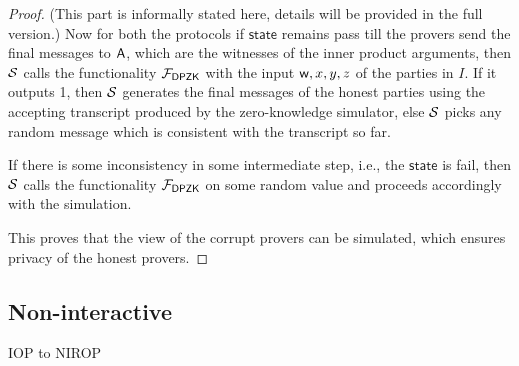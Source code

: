 \begin{proof}
	(This part is informally stated here, details will be provided in the full version.)
	Now for both the protocols if $\mathsf{state}$ remains pass till the provers send the final messages to $\mathsf{A}$, which are the witnesses of the inner product arguments, 
	then $\mathcal{S}$ calls the functionality $\mathcal{F}_{\mathsf{DPZK}}$ with the input $\mathsf{w}, x,y,z$ of the parties in $I$. If it outputs 1, then $\mathcal{S}$ generates the final messages of the honest parties using the accepting transcript produced by the zero-knowledge simulator, else $\mathcal{S}$ picks any random message which is consistent with the transcript so far.
	
	If there is some inconsistency in some intermediate step, i.e., the $\mathsf{state}$ is fail, then $\mathcal{S}$ calls the functionality $\mathcal{F}_{\mathsf{DPZK}}$ on some random value and proceeds accordingly with the simulation.
	
	This proves that the view of the corrupt provers can be simulated, which ensures privacy of the honest provers.
\end{proof}

   



\subsection{Non-interactive}
IOP to NIROP

